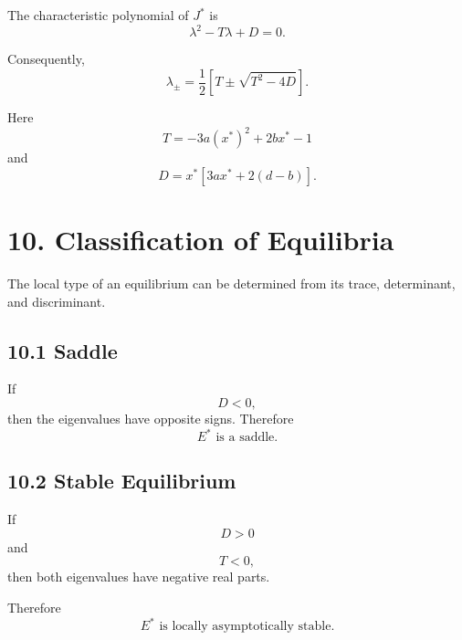 \documentclass[11pt,a4paper]{article}
\begin{document}
The characteristic polynomial of $J^*$ is
\begin{equation}
\lambda^2-T\lambda+D=0.
\tag{34}
\end{equation}

Consequently,
\begin{equation}
\boxed{
\lambda_{\pm}
=
\frac12
\left[
T\pm\sqrt{T^2-4D}
\right].
}
\tag{35}
\end{equation}

Here
\begin{equation}
T=-3a(x^*)^2+2bx^*-1
\end{equation}
and
\begin{equation}
D=
x^*
\left[
3ax^*+2(d-b)
\right].
\end{equation}

\section{10. Classification of Equilibria}

The local type of an equilibrium can be determined from its trace,
determinant, and discriminant.

\subsection*{10.1 Saddle}

If
\begin{equation}
\boxed{
D<0,
}
\tag{36}
\end{equation}
then the eigenvalues have opposite signs. Therefore
\begin{equation}
\boxed{
E^*\text{ is a saddle}.
}
\tag{37}
\end{equation}

\subsection*{10.2 Stable Equilibrium}

If
\begin{equation}
D>0
\end{equation}
and
\begin{equation}
T<0,
\end{equation}
then both eigenvalues have negative real parts.

Therefore
\begin{equation}
\boxed{
E^*\text{ is locally asymptotically stable}.
}
\tag{38}
\end{equation}
\end{document}
